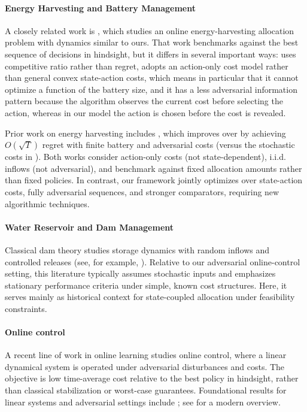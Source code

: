 \documentclass[11pt]{article}
\begin{document}
\paragraph{Energy Harvesting and Battery Management}
A closely related work is \cite{lin2025optimal}, which studies an online energy-harvesting allocation problem with dynamics similar to ours. That work benchmarks against the best sequence of decisions in hindsight, but it differs in several important ways: \cite{lin2025optimal} uses competitive ratio rather than regret, adopts an action-only cost model rather than general convex state-action costs, which means in particular that it cannot optimize a function of the battery size, and it has a less adversarial information pattern because the algorithm observes the current cost before selecting the action, whereas in our model the action is chosen before the cost is revealed.

Prior work on energy harvesting includes \cite{10.1145/3428337}, which improves over \cite{Yu2019} by achieving $O(\sqrt{T})$ regret with finite battery and adversarial costs (versus the stochastic costs in \cite{Yu2019}). Both works consider action-only costs (not state-dependent), i.i.d. inflows (not adversarial), and benchmark against fixed allocation amounts rather than fixed policies. In contrast, our framework jointly optimizes over state-action costs, fully adversarial sequences, and stronger comparators, requiring new algorithmic techniques.


\paragraph{Water Reservoir and Dam Management}
Classical dam theory studies storage dynamics with random inflows and controlled releases (see, for example, \cite{moran1954dams,prabhu1998stochastic}). Relative to our adversarial online-control setting, this literature typically assumes stochastic inputs and emphasizes stationary performance criteria under simple, known cost structures. Here, it serves mainly as historical context for state-coupled allocation under feasibility constraints.


\paragraph{Online control}

A recent line of work in online learning studies online control, where a linear dynamical system is operated under adversarial disturbances and costs. The objective is low time-average cost relative to the best policy in hindsight, rather than classical stabilization or worst-case guarantees. Foundational results for linear systems and adversarial settings include \cite{agarwal2019online, agarwal2019logarithmic, hazan2020nonstochasticBandit, simchowitz2020improper}; see \cite{hazan_introduction_2025} for a modern overview.
\end{document}
